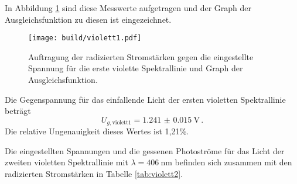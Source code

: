 In Abbildung \ref{fig:violett1} sind diese Messwerte aufgetragen und der Graph der Ausgleichsfunktion zu
diesen ist eingezeichnet.

\begin{figure}
  \centering
  \texttt{[image: build/violett1.pdf]}
  \caption{Auftragung der radizierten Stromstärken gegen die eingestellte Spannung für die erste violette Spektrallinie und Graph der Ausgleichsfunktion.}
  \label{fig:violett1}
\end{figure}

Die Gegenspannung für das einfallende Licht der ersten violetten Spektrallinie beträgt
\begin{equation*}
  U_{g,\text{violett1}} = \SI{1.241(0015)}{\volt}\,.
\end{equation*}
Die relative Ungenauigkeit dieses Wertes ist 1,21\%.

Die eingestellten Spannungen und die gessenen Photoströme für das Licht
der zweiten violetten Spektrallinie mit $\lambda = \SI{406}{\nano\meter}$ befinden sich zusammen mit
den radizierten Stromstärken in Tabelle \ref{tab:violett2}.

